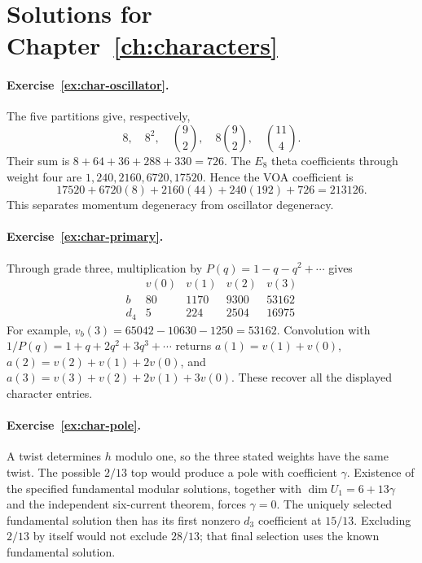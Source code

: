 \section{Solutions for Chapter~\ref{ch:characters}}

\paragraph{Exercise~\ref{ex:char-oscillator}.}
\label{sol:ex:char-oscillator}
The five partitions give, respectively,
\[
 8,\quad8^2,\quad\binom92,\quad
 8\binom92,\quad\binom{11}{4}.
\]
Their sum is $8+64+36+288+330=726$.
The $E_8$ theta coefficients through weight four are
$1,240,2160,6720,17520$. Hence the VOA coefficient is
\[
 17520+6720(8)+2160(44)+240(192)+726=213126.
\]
This separates momentum degeneracy from oscillator degeneracy.



\paragraph{Exercise~\ref{ex:char-primary}.}
\label{sol:ex:char-primary}
Through grade three, multiplication by
$P(q)=1-q-q^2+\cdots$ gives
\[
\begin{array}{c|rrrr}
 &v(0)&v(1)&v(2)&v(3)\\\hline
 b&80&1170&9300&53162\\
 d_4&5&224&2504&16975
\end{array}
\]
For example, $v_b(3)=65042-10630-1250=53162$.
Convolution with $1/P(q)=1+q+2q^2+3q^3+\cdots$
returns
$a(1)=v(1)+v(0)$,
$a(2)=v(2)+v(1)+2v(0)$, and
$a(3)=v(3)+v(2)+2v(1)+3v(0)$.
These recover all the displayed character entries.



\paragraph{Exercise~\ref{ex:char-pole}.}
\label{sol:ex:char-pole}
A twist determines $h$ modulo one, so the three stated
weights have the same twist. The possible $2/13$ top would
produce a pole with coefficient $\gamma$. Existence of the
specified fundamental modular solutions, together with
$\dim U_1=6+13\gamma$ and the independent six-current theorem,
forces $\gamma=0$. The uniquely selected fundamental solution
then has its first nonzero $d_3$ coefficient at $15/13$.
Excluding $2/13$ by itself would not exclude $28/13$;
that final selection uses the known fundamental solution.



